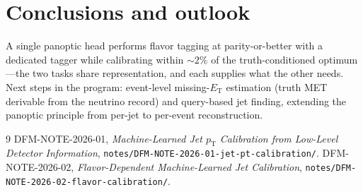 \documentclass[11pt]{article}
\newcommand{\pt}{\ensuremath{p_\mathrm{T}}}
\begin{document}
\section{Conclusions and outlook}
A single panoptic head performs flavor tagging at parity-or-better with a dedicated
tagger while calibrating within ${\sim}2\%$ of the truth-conditioned optimum---the
two tasks share representation, and each supplies what the other needs. Next steps in
the program: event-level missing-$E_\mathrm{T}$ estimation (truth MET derivable from
the neutrino record) and query-based jet finding, extending the panoptic principle
from per-jet to per-event reconstruction.

\begin{thebibliography}{9}
 DFM-NOTE-2026-01, \emph{Machine-Learned Jet \pt{} Calibration from
Low-Level Detector Information},
\texttt{notes/DFM-NOTE-2026-01-jet-pt-calibration/}.
 DFM-NOTE-2026-02, \emph{Flavor-Dependent Machine-Learned Jet
Calibration}, \texttt{notes/DFM-NOTE-2026-02-flavor-calibration/}.
\end{thebibliography}
\end{document}

